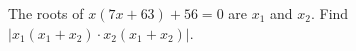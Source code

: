 The roots of $x(7x+63)+56=0$ are $x_1$ and $x_2$. Find $\left|x_1\left(x_1+x_2\right)\cdot x_2\left(x_1+x_2\right)\right|$.
